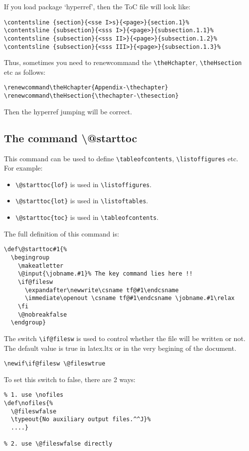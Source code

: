 \documentclass{article}
\begin{document}
If you load package `hyperref', then the ToC file will look like:
\begin{lstlisting}
\contentsline {section}{<sse I>s}{<page>}{section.1}%
\contentsline {subsection}{<sss I>}{<page>}{subsection.1.1}%
\contentsline {subsection}{<sss II>}{<page>}{subsection.1.2}%
\contentsline {subsection}{<sss III>}{<page>}{subsection.1.3}%
\end{lstlisting}

Thus, sometimes you need to renewcommand the \verb|\theHchapter|, \verb|\theHsection| etc as follows:
\begin{lstlisting}
\renewcommand\theHchapter{Appendix-\thechapter}
\renewcommand\theHsection{\thechapter-\thesection}
\end{lstlisting}

Then the hyperref jumping will be correct.

\subsection{The command \textbackslash @starttoc}
This command can be used to define \verb|\tableofcontents|, \verb|\listoffigures| etc. For example: 
\begin{itemize}
\item \verb|\@starttoc{lof}| is used in \verb|\listoffigures|. 
\item \verb|\@starttoc{lot}| is used in \verb|\listoftables|.
\item \verb|\@starttoc{toc}| is used in \verb|\tableofcontents|.
\end{itemize}

The full definition of this command is:
\begin{lstlisting}
\def\@starttoc#1{%
  \begingroup
    \makeatletter
    \@input{\jobname.#1}% The key command lies here !!
    \if@filesw
      \expandafter\newwrite\csname tf@#1\endcsname
      \immediate\openout \csname tf@#1\endcsname \jobname.#1\relax
    \fi
    \@nobreakfalse
  \endgroup}
\end{lstlisting}


The switch \verb|\if@filesw| is used to control whether the file will be written or not. The default value is true in latex.ltx
or in the very begining of the document.
\begin{lstlisting}
\newif\if@filesw \@fileswtrue
\end{lstlisting}

To set this switch to false, there are 2 ways:
\begin{lstlisting}
% 1. use \nofiles
\def\nofiles{%
  \@fileswfalse
  \typeout{No auxiliary output files.^^J}%
  ....}

% 2. use \@fileswfalse directly
\end{lstlisting}
\end{document}
